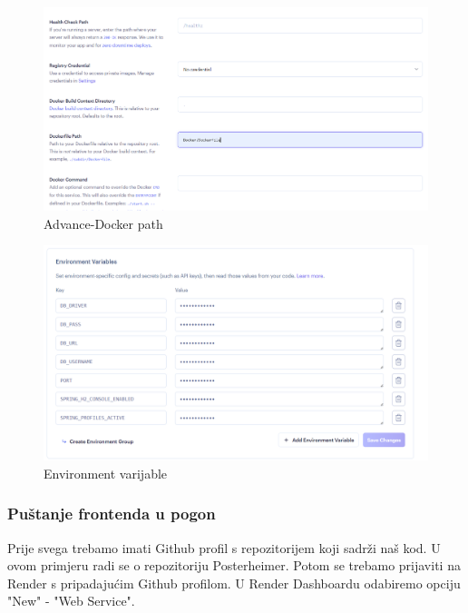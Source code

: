 			\begin{figure} [H]
				\includegraphics[width=\linewidth]{Slike/Advance-Docker path}
				\caption{Advance-Docker path}
			\end{figure}
			
			\begin{figure} [H]
				\includegraphics[width=\linewidth]{Slike/Environment varijable}
				\caption{Environment varijable }
			\end{figure}
			
			\newpage
			
			\subsubsection{Puštanje frontenda u pogon}
			Prije svega trebamo imati Github profil s repozitorijem koji sadrži naš kod. U ovom primjeru radi se o repozitoriju Posterheimer. Potom se trebamo prijaviti na Render s pripadajućim Github profilom. U Render Dashboardu odabiremo opciju "New" - "Web Service". 
			
